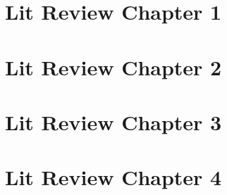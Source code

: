 \newenvironment{levelup}%
  {\let\subparagraph\paragraph%
   \let\paragraph\subsubsection%
   \let\subsubsection\subsection%
   \let\subsection\section%
   \let\section\chapter
}{}

\begin{leveldown}

\chapter{Lit Review Chapter 1}

\newpage
\chapter{Lit Review Chapter 2}

\newpage
\chapter{Lit Review Chapter 3}

\newpage
\chapter{Lit Review Chapter 4}

\end{leveldown}
